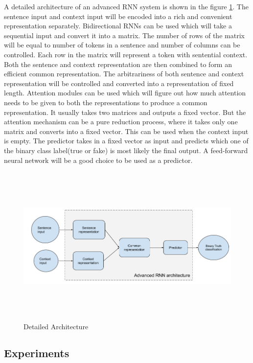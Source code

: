 \documentclass[a4paper, 11pt]{article}
\begin{document}
A detailed architecture of an advanced RNN system is shown in the figure \ref{fig:detailed_architecture}. The sentence input and context input will be encoded into a rich and convenient representation separately. Bidirectional RNNs can be used which will take a sequential input and convert it into a matrix. The number of rows of the matrix will be equal to number of tokens in a sentence and number of columns can be controlled. Each row in the matrix will represent a token with sentential context. Both the sentence and context representation are then combined to form an efficient common representation. The arbitrariness of both sentence and context representation will be controlled and converted into a representation of fixed length. Attention modules can be used which will figure out how much attention needs to be given to both the representations to produce a common representation. It usually takes two matrices and outputs a fixed vector. But the attention mechanism can be a pure reduction process, where it takes only one matrix and converts into a fixed vector. This can be used when the context input is empty. The predictor takes in a fixed vector as input and predicts which one of the binary class label(true or fake) is most likely the final output. A feed-forward neural network will be a good choice to be used as a predictor. 

\begin{figure}[htpb]
    \centering
    \includegraphics[width=\textwidth,height=8cm,keepaspectratio=true]
    {detailed-architecture-diagram.png}
    \caption{
        Detailed Architecture
    }
    \label{fig:detailed_architecture}
\end{figure}

\subsection{Experiments}
\end{document}

